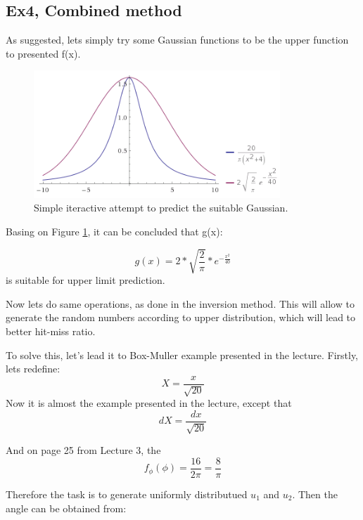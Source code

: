 \documentclass{article}
\begin{document}
\subsection*{Ex4, Combined method}

As suggested, lets simply try some Gaussian functions to be the upper function to presented f(x).

\begin{figure}[!hbt]
	\includegraphics[width=350px]{../Laskari2/ex4Gaussian}
	\caption{Simple iteractive attempt to predict the suitable Gaussian.}
	\label{fig:ex4Gaussian}
\end{figure}

Basing on Figure \ref{fig:ex4Gaussian}, it can be concluded that g(x):

\begin{equation}
	g(x)=2*\sqrt{\frac{2}{\pi}}*e^{-\frac{x^2}{40}}
\end{equation}
is suitable for upper limit prediction.

Now lets do same operations, as done in the inversion method. This will allow to generate the random numbers according to upper distribution, which will lead to better hit-miss ratio.

To solve this, let's lead it to Box-Muller example presented in the lecture. Firstly, lets redefine:
\begin{equation}
	X=\frac{x}{\sqrt{20}}
\end{equation}
Now it is almost the example presented in the lecture, except that
\begin{equation}
	dX=\frac{dx}{\sqrt{20}}
\end{equation}

And on page 25 from Lecture 3, the
\begin{equation}
	f_\phi (\phi)=\frac{16}{2\pi}=\frac{8}{\pi}
\end{equation}

Therefore the task is to generate uniformly distributued $u_1$ and $u_2$. Then the angle can be obtained from:
\end{document}
